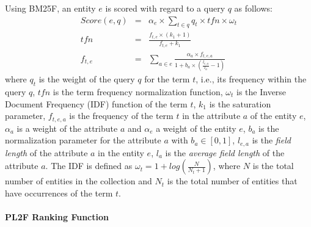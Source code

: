 Using BM25F, an entity $e$ is scored with regard to a query $q$ as follows:
\begin{eqnarray}
  Score(e,q) & = & \alpha_e\times\sum_{t\in q}{q_t\times tfn \times \omega_t}\\
  \label{eq:tfidf-score}
  tfn & = & \frac{f_{t,e}\times(k_1+1)}{f_{t,e}+k_1} \\
  \label{eq:bm25f_2}
  f_{t,e} & = &
  \sum_{a\in e}{\frac{\alpha_a\times f_{t,e,a}}{1+b_a\times\left(\frac{l_{e,a}}{l_a}-1\right)}}
  \label{eq:bm25f_1}
\end{eqnarray}
where $q_t$ is the weight of the query $q$ for the term $t$, i.e., its frequency within the query $q$, $tfn$ is the term frequency normalization function, $\omega_t$ is the Inverse Document Frequency (IDF) function of the term $t$, $k_1$ is the saturation parameter, $f_{t,e,a}$ is the frequency of the term $t$ in the attribute $a$ of the entity $e$, $\alpha_a$ is a weight of the attribute $a$ and $\alpha_e$ a weight of the entity $e$, $b_a$ is the normalization parameter for the attribute $a$ with $b_a \in \left[0,1\right]$, $l_{e,a}$ is the \emph{field length} of the attribute $a$ in the entity $e$, $l_a$ is the \emph{average field length} of the attribute $a$. The IDF is defined as
$
\omega_t=1+log\left(\frac{N}{N_t+1}\right)
$,
where $N$ is the total number of entities in the collection and $N_t$ is the total number of entities that have occurrences of the term $t$.

\paragraph{PL2F Ranking Function}

